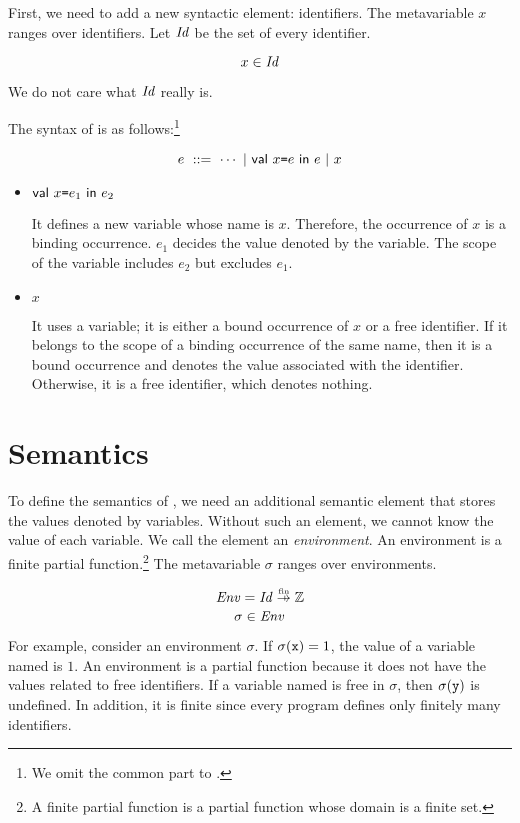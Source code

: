 First, we need to add a new syntactic element: identifiers. The metavariable
$x$ ranges over identifiers. Let $\mbox{\emph{Id}}$ be the set of every
identifier.

\[x\in\mbox{\emph{Id}}\]

We do not care what $\mbox{\emph{Id}}$ really is.

The syntax of \Lang is as follows:\footnote{We omit the common part
to \plang.}

\[e\ ::=\ \cdots\ |\ \ebind{x}{e}{e}\ |\ x\]

\begin{itemize}
  \item $\textsf{val}\ x\texttt{=} e_1\ \textsf{in}\ e_2$

    It defines a new variable whose name is $x$. Therefore, the occurrence of $x$ is a
    binding occurrence. $e_1$ decides the value denoted by the variable. The
    scope of the variable includes $e_2$ but excludes $e_1$.

  \item $x$

    It uses a variable; it is either a bound occurrence of $x$ or a free identifier.
    If it belongs to the scope of a binding occurrence of the same name, then it is a
    bound occurrence and denotes the value associated with the identifier.
    Otherwise, it is a free identifier, which denotes nothing.
\end{itemize}

\section{Semantics}

To define the semantics of \Lang, we need an additional semantic element that
stores the values denoted by variables. Without such an element, we cannot know the
value of each variable. We call the element an
\textit{environment}. An environment is a finite partial
function.\footnote{A finite partial function is a partial function whose domain
is a finite set.} The metavariable $\sigma$ ranges over environments.

\[\embox{Env}=\embox{Id}\finto\mathbb{Z}\]
\[\sigma\in\mbox{\emph{Env}}\]

For example, consider an environment $\sigma$.
If $\sigma(\texttt{x})=1$, the value of a variable named  is $1$.
An environment is a partial function because it does not have the values
related to free identifiers. If a variable named  is free in
$\sigma$, then $\sigma(\texttt{y})$ is undefined.
In addition, it is finite since every program
defines only finitely many identifiers.

